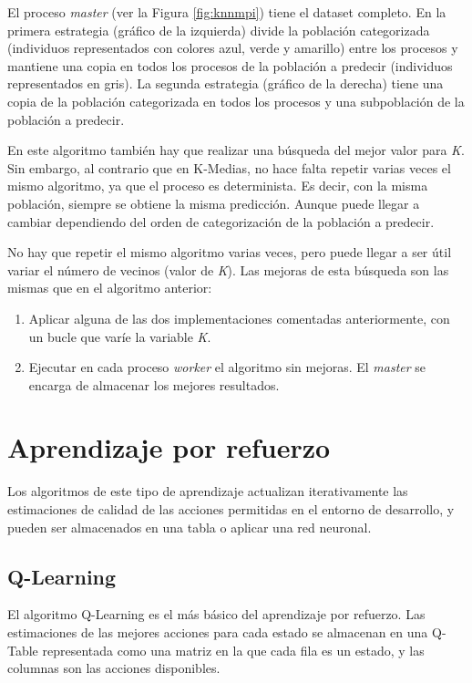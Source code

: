 		El proceso \textit{master} (ver la Figura \ref{fig:knnmpi}) tiene el dataset completo. En la primera estrategia (gráfico de la izquierda) divide la población categorizada (individuos representados con colores azul, verde y amarillo) entre los procesos y mantiene una copia en todos los procesos de la población a predecir (individuos representados en gris). La segunda estrategia (gráfico de la derecha) tiene una copia de la población categorizada en todos los procesos y una subpoblación de la población a predecir.
		
		
		En este algoritmo también hay que realizar una búsqueda del mejor valor para \textit{K}. Sin embargo, al contrario que en K-Medias, no hace falta repetir varias veces el mismo algoritmo, ya que el proceso es determinista. Es decir, con la misma población, siempre se obtiene la misma predicción. Aunque puede llegar a cambiar dependiendo del orden de categorización de la población a predecir. 
		
		No hay que repetir el mismo algoritmo varias veces, pero puede llegar a ser útil variar el número de vecinos (valor de \textit{K}). Las mejoras de esta búsqueda son las mismas que en el algoritmo anterior: 
		
		\begin{enumerate}
			\item Aplicar alguna de las dos implementaciones comentadas anteriormente, con un bucle que varíe la variable \textit{K}. 
			\item Ejecutar en cada proceso \textit{worker} el algoritmo sin mejoras. El \textit{master} se encarga de almacenar los mejores resultados.
		\end{enumerate}
		
		


\section{Aprendizaje por refuerzo}
	\label{cap:3_3}
	Los algoritmos de este tipo de aprendizaje actualizan iterativamente las estimaciones de calidad de las acciones permitidas en el entorno de desarrollo, y pueden ser almacenados en una tabla o aplicar una red neuronal.
	
	\subsection{Q-Learning}
	\label{cap:3_3_1}
		El algoritmo Q-Learning es el más básico del aprendizaje por refuerzo. Las estimaciones de las mejores acciones para cada estado se almacenan en una Q-Table representada como una matriz en la que cada fila es un estado, y las columnas son las acciones disponibles. 
		
